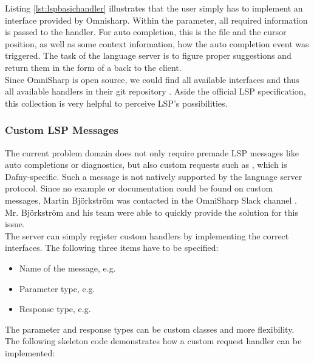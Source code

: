 Listing \ref{lst:lspbasichandler} illustrates that the user simply has to implement an interface provided by Omnisharp.
Within the  parameter, all required information is passed to the handler.
For auto completion, this is the file and the cursor position, as well as some context information, how the auto completion event was triggered.
The task of the language server is to figure proper suggestions and return them in the form of a  back to the client.\\

Since OmniSharp is open source, we could find all available interfaces and thus all available handlers in their git repository \cite{omnisharpgit}.
Aside the official LSP specification, this collection is very helpful to perceive LSP's possibilities.

\subsubsection{Custom LSP Messages}
\label{chapter:customlspmsg}
The current problem domain does not only require premade LSP messages like auto completions or diagnostics, but also custom requests such as , which is Dafny-specific.
Such a message is not natively supported by the language server protocol.
Since no example or documentation could be found on custom messages, Martin Bj\"orkstr\"om was contacted in the OmniSharp Slack channel \cite{omnisharpslack}.
Mr. Bj\"orkstr\"om and his team were able to quickly provide the solution for this issue.\\

The server can simply register custom handlers by implementing the correct interfaces.
The following three items have to be specified:
\begin{itemize}
    \item Name of the message, e.g. 
    \item Parameter type, e.g. 
    \item Response type, e.g. 
\end{itemize}


The parameter and response types can be custom classes and more flexibility. 
The following skeleton code demonstrates how a custom request handler can be implemented:

